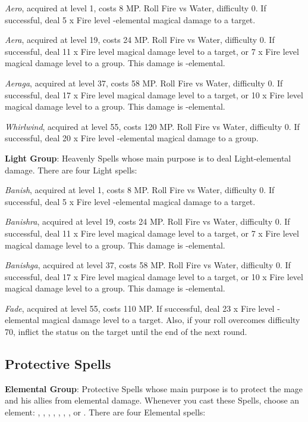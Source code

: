 \begin{multicols}{2}
    \textit{Aero}, acquired at level 1, costs 8 MP. Roll Fire vs Water, difficulty 0. If successful, deal 5 x Fire level -elemental magical damage to a target.

    \textit{Aera}, acquired at level 19, costs 24 MP. Roll Fire vs Water, difficulty 0. If successful, deal 11 x Fire level magical damage level to a target, or 7 x Fire level magical damage level to a group. This damage is -elemental.

    \textit{Aeraga}, acquired at level 37, costs 58 MP. Roll Fire vs Water, difficulty 0. If successful, deal 17 x Fire level magical damage level to a target, or 10 x Fire level magical damage level to a group. This damage is -elemental.

    \textit{Whirlwind}, acquired at level 55, costs 120 MP. Roll Fire vs Water, difficulty 0. If successful, deal 20 x Fire level -elemental magical damage to a group.

    \textbf{Light Group}: Heavenly Spells whose main purpose is to deal Light-elemental damage. There are four Light spells:

    \textit{Banish}, acquired at level 1, costs 8 MP. Roll Fire vs Water, difficulty 0. If successful, deal 5 x Fire level -elemental magical damage to a target.

    \textit{Banishra}, acquired at level 19, costs 24 MP. Roll Fire vs Water, difficulty 0. If successful, deal 11 x Fire level magical damage level to a target, or 7 x Fire level magical damage level to a group. This damage is -elemental.

    \textit{Banishga}, acquired at level 37, costs 58 MP. Roll Fire vs Water, difficulty 0. If successful, deal 17 x Fire level magical damage level to a target, or 10 x Fire level magical damage level to a group. This damage is -elemental.

    \textit{Fade}, acquired at level 55, costs 110 MP. If successful, deal 23 x Fire level -elemental magical damage level to a target. Also, if your roll overcomes difficulty 70, inflict the  status on the target until the end of the next round.

    \subsection{Protective Spells}

    \textbf{Elemental Group}: Protective Spells whose main purpose is to protect the mage and his allies from elemental damage. Whenever you cast these Spells, choose an element: , , , , , , ,  or . There are four Elemental spells:


\end{multicols}

